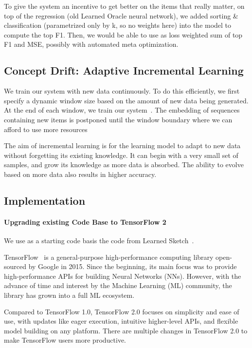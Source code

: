 To give the system an incentive to get better on the items that really matter, on top of the regression (old Learned Oracle neural network), we added sorting \& classification  (parametrized only by k, so no weights here) into the model to compute the top F1. Then, we would be able to use as loss weighted sum of top F1 and MSE, possibly with automated meta optimization. 


\subsection{Concept Drift: Adaptive Incremental Learning}

We train our system with new data continuously. To do this efficiently, we first specify a dynamic window size based on the amount of new data being generated. At the end of each window, we train our system~\cite{misra1982finding,fan2000summary}. The embedding of sequences containing new items is postponed until the window boundary where we can afford to use more resources

The aim of incremental learning is for the learning model to adapt to new data without forgetting its existing knowledge. It can begin with a very small set of samples, and grow its knowledge as more data is absorbed. The ability to evolve based on more data also results in higher accuracy.


\subsection{Implementation}

\paragraph{Upgrading existing Code Base to TensorFlow 2}

We use as a starting code basis the code from Learned Sketch~\cite{hsu2019learning}.

TensorFlow~\cite{tensorflow2015-whitepaper} is a general-purpose high-performance computing library open-sourced by Google in 2015. Since the beginning, its main focus was to provide high-performance APIs for building Neural Networks (NNs). However, with the advance of time and interest by the Machine Learning (ML) community, the library has grown into a full ML ecosystem.

Compared to TensorFlow 1.0, TensorFlow 2.0 focuses on simplicity and ease of use, with updates like eager execution, intuitive higher-level APIs, and flexible model building on any platform. There are multiple changes in TensorFlow 2.0 to make TensorFlow users more productive.

